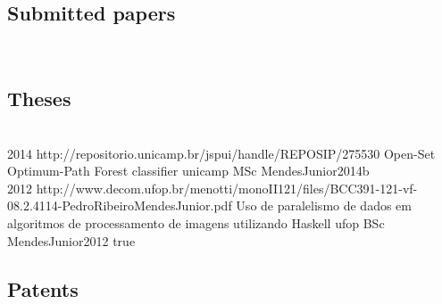 \subsection*{Submitted papers}

\begin{publications}
  \\

\end{publications}

\subsection*{Theses}

\begin{publications}
  \\

  {2014}
  {http://repositorio.unicamp.br/jspui/handle/REPOSIP/275530}
  {Open-Set Optimum-Path Forest classifier}
  {unicamp}
  {MSc}
  {MendesJunior2014b}
  {}
  \\

  {2012}
  {http://www.decom.ufop.br/menotti/monoII121/files/BCC391-121-vf-08.2.4114-PedroRibeiroMendesJunior.pdf}
  {Uso de paralelismo de dados em algoritmos de processamento de imagens utilizando Haskell}
  {ufop}
  {BSc}
  {MendesJunior2012}
  {true}
  \\

\end{publications}

\subsection*{Patents}

